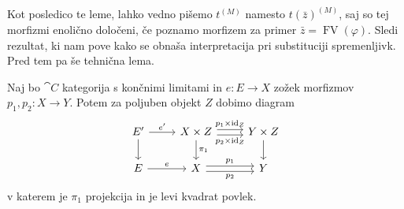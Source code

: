 \documentclass[../kategoricna_logika.tex]{subfiles}
\begin{document}
  Kot posledico te leme, lahko vedno pišemo $t^{(M)}$ namesto
  $t(\bar{z})^{(M)}$, saj so tej morfizmi enolično določeni, če
  poznamo morfizem za primer $\bar{z} = \operatorname{FV}(\varphi)$.
  Sledi rezultat, ki nam pove kako se obnaša interpretacija pri
  substituciji spremenljivk. Pred tem pa še tehnična lema.
  \begin{lema}\label{lema:zožek-dodatnega-faktorja}
    Naj bo $\cat{C}$ kategorija s končnimi limitami in $e : E \to X$
    zožek morfizmov $p_1, p_2 : X \to Y$. Potem za poljuben objekt $Z$
    dobimo diagram
    \begin{equation*}
      \begin{tikzcd}
        E' \ar[d] \ar[r, "e'"] & X \times Z \ar[d, "\pi_1"] \ar[r, shift left, "p_1 \times \mathrm{id}_Z"] \ar[r, shift right, "p_2 \times \mathrm{id}_Z"'] & Y \times Z \ar[d] \\
        E \ar[r, "e"] & X \ar[r, shift left, "p_1"] \ar[r, shift right, "p_2"'] & Y
      \end{tikzcd}
    \end{equation*}
    v katerem je $\pi_1$ projekcija in je levi kvadrat povlek.
  \end{lema}
\end{document}
